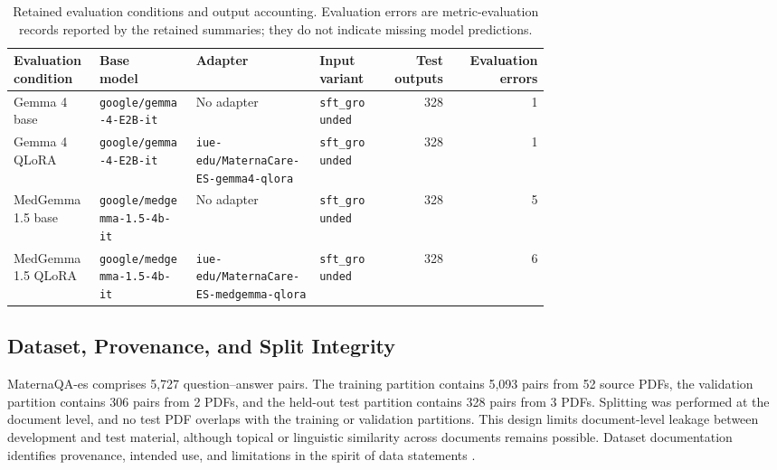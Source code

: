 \begin{table}[htbp]
\centering
\small
\setlength{\tabcolsep}{3pt}
{\scriptsize
\begin{tabular}{@{}p{0.16\linewidth}p{0.18\linewidth}p{0.23\linewidth}p{0.12\linewidth}r r@{}}
\hline
\shortstack{Evaluation\\condition} & \shortstack{Base\\model} & Adapter & \shortstack{Input\\variant} & \shortstack{Test\\outputs} & \shortstack{Evaluation\\errors} \\
\hline
Gemma 4 base & \scriptsize\texttt{google/}\allowbreak\texttt{gemma-4-E2B-it} & No adapter & \texttt{sft\_grounded} & 328 & 1 \\
Gemma 4 QLoRA & \scriptsize\texttt{google/}\allowbreak\texttt{gemma-4-E2B-it} & \scriptsize\texttt{iue-edu/}\allowbreak\texttt{MaternaCare-ES-}\allowbreak\texttt{gemma4-qlora} & \texttt{sft\_grounded} & 328 & 1 \\
MedGemma 1.5 base & \scriptsize\texttt{google/}\allowbreak\texttt{medgemma-1.5-}\allowbreak\texttt{4b-it} & No adapter & \texttt{sft\_grounded} & 328 & 5 \\
MedGemma 1.5 QLoRA & \scriptsize\texttt{google/}\allowbreak\texttt{medgemma-1.5-}\allowbreak\texttt{4b-it} & \scriptsize\texttt{iue-edu/}\allowbreak\texttt{MaternaCare-ES-}\allowbreak\texttt{medgemma-qlora} & \texttt{sft\_grounded} & 328 & 6 \\
\hline
\end{tabular}
}
\caption{Retained evaluation conditions and output accounting. Evaluation errors are metric-evaluation records reported by the retained summaries; they do not indicate missing model predictions.}
\label{tab:evaluation-conditions}
\end{table}

\subsection{Dataset, Provenance, and Split Integrity}

MaternaQA-es comprises 5,727 question--answer pairs. The training partition contains 5,093 pairs from 52 source PDFs, the validation partition contains 306 pairs from 2 PDFs, and the held-out test partition contains 328 pairs from 3 PDFs. Splitting was performed at the document level, and no test PDF overlaps with the training or validation partitions. This design limits document-level leakage between development and test material, although topical or linguistic similarity across documents remains possible. Dataset documentation identifies provenance, intended use, and limitations in the spirit of data statements \cite{Bender2018DataStatements}.

